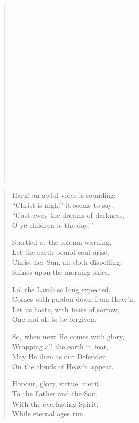 \begin{verse}
 \\
 \\
 \\

 \\
 \\
 \\

 \\
 \\
 \\

 \\
 \\
 \\

 \\
 \\
 \\
\end{verse}
\begin{verse}
Hark! an awful voice is sounding; \\
``Christ is nigh!'' it seems to say; \\
``Cast away the dreams of darkness, \\
O ye children of the day!''

Startled at the solemn warning, \\
Let the earth-bound soul arise; \\
Christ her Sun, all sloth dispelling, \\
Shines upon the morning skies.

Lo! the Lamb so long expected, \\
Comes with pardon down from Heav'n; \\
Let us haste, with tears of sorrow, \\
One and all to be forgiven.

So, when next He comes with glory, \\
Wrapping all the earth in fear, \\
May He then as our Defender \\
On the clouds of Heav'n appear.

Honour, glory, virtue, merit, \\
To the Father and the Son, \\
With the everlasting Spirit, \\
While eternal ages run.
\end{verse}

